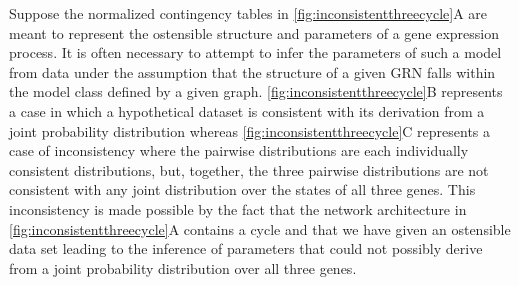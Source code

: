 Suppose the normalized contingency tables in \ref{fig:inconsistentthreecycle}A are meant to represent the ostensible structure and parameters of a gene expression process. It is often necessary to attempt to infer the parameters of such a model from data under the assumption that the structure of a given GRN falls within the model class defined by a given graph. \ref{fig:inconsistentthreecycle}B represents a case in which a hypothetical dataset is consistent with its derivation from a joint probability distribution whereas \ref{fig:inconsistentthreecycle}C represents a case of inconsistency where the pairwise distributions are each individually consistent distributions, but, together, the three pairwise distributions are not consistent with any joint distribution over the states of all three genes.
This inconsistency is made possible by the fact that the network architecture in \ref{fig:inconsistentthreecycle}A contains a cycle \cite{Lauritzen1996,Geiger2006,Wainwright2007} and that we have given an ostensible data set leading to the inference of parameters that could not possibly derive from a joint probability distribution over all three genes.


